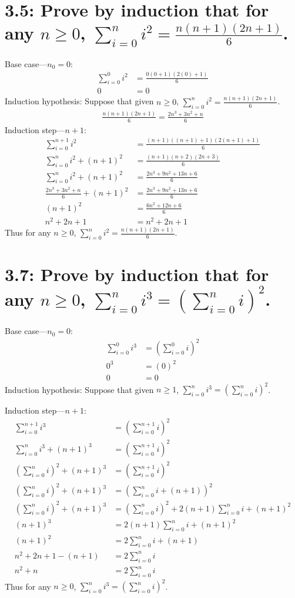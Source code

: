 \documentclass{article}
\begin{document}
\section*{3.5: Prove by induction that for any $n\geq0$, $\sum_{i=0}^ni^2=\frac{n(n+1)(2n+1)}{6}$.}
Base case---$n_0=0$:
\begin{align*}
  \sum_{i=0}^0i^2&=\frac{0(0+1)(2(0)+1)}{6}\\
  0&=0
\end{align*}
Induction hypothesis: Suppose that given $n\geq0$, $\sum_{i=0}^ni^2=\frac{n(n+1)(2n+1)}{6}$.
\begin{align*}
  \frac{n(n+1)(2n+1)}{6}=\frac{2n^3+3n^2+n}{6}
\end{align*}
Induction step---$n+1$:
\begin{align*}
  \sum_{i=0}^{n+1}i^2&=\frac{(n+1)((n+1)+1)(2(n+1)+1)}{6}\\
  \sum_{i=0}^{n}i^2+(n+1)^2&=\frac{(n+1)(n+2)(2n+3)}{6}\\
  \sum_{i=0}^{n}i^2+(n+1)^2&=\frac{2n^3+9n^2+13n+6}{6}\\
  \frac{2n^3+3n^2+n}{6}+(n+1)^2&=\frac{2n^3+9n^2+13n+6}{6}\\
  (n+1)^2&=\frac{6n^2+12n+6}{6}\\
  n^2+2n+1&=n^2+2n+1
\end{align*}
Thus for any $n\geq0$, $\sum_{i=0}^ni^2=\frac{n(n+1)(2n+1)}{6}$.
\section*{3.7: Prove by induction that for any $n\geq0$, $\sum_{i=0}^ni^3=\left(\sum_{i=0}^ni\right)^2$.}
Base case---$n_0=0$:
\begin{align*}
  \sum_{i=0}^0i^3&=\left(\sum_{i=0}^0i\right)^2\\
  0^3&=(0)^2\\
  0&=0
\end{align*}
Induction hypothesis: Suppose that given $n\geq1$, $\sum_{i=0}^ni^3=\left(\sum_{i=0}^ni\right)^2$.

Induction step---$n+1$:
\begin{align*}
  \sum_{i=0}^{n+1}i^3&=\left(\sum_{i=0}^{n+1}i\right)^2\\
  \sum_{i=0}^{n}i^3+(n+1)^3&=\left(\sum_{i=0}^{n+1}i\right)^2\\
  \left(\sum_{i=0}^{n}i\right)^2+(n+1)^3&=\left(\sum_{i=0}^{n+1}i\right)^2\\
  \left(\sum_{i=0}^{n}i\right)^2+(n+1)^3&=\left(\sum_{i=0}^ni+(n+1)\right)^2\\
  \left(\sum_{i=0}^{n}i\right)^2+(n+1)^3&=\left(\sum_{i=0}^ni\right)^2+2(n+1)\sum_{i=0}^ni+(n+1)^2\\
  (n+1)^3&=2(n+1)\sum_{i=0}^ni+(n+1)^2\\
  (n+1)^2&=2\sum_{i=0}^ni+(n+1)\\
  n^2+2n+1-(n+1)&=2\sum_{i=0}^ni\\
  n^2+n&=2\sum_{i=0}^ni
\end{align*}
Thus for any $n\geq0$, $\sum_{i=0}^ni^3=\left(\sum_{i=0}^ni\right)^2$.
\end{document}
